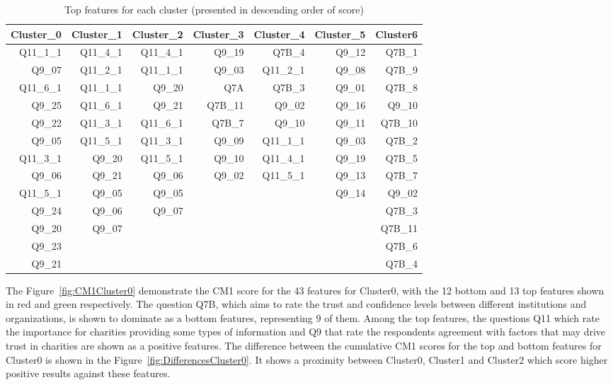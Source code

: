 \documentclass{article}
\begin{document}
\begin{table}[htbp]
  \centering
  \caption{Top features for each cluster (presented in descending order of
  score)}
    \begin{tabular}{rrrrrrr}
    \toprule
    Cluster\_0 & Cluster\_1 & Cluster\_2 & Cluster\_3 & Cluster\_4 & Cluster\_5 & Cluster6 \\
    \midrule
    Q11\_1\_1 & Q11\_4\_1 & Q11\_4\_1 & Q9\_19 & Q7B\_4 & Q9\_12 & Q7B\_1 \\
    Q9\_07 & Q11\_2\_1 & Q11\_1\_1 & Q9\_03 & Q11\_2\_1 & Q9\_08 & Q7B\_9 \\
    Q11\_6\_1 & Q11\_1\_1 & Q9\_20 & Q7A   & Q7B\_3 & Q9\_01 & Q7B\_8 \\
    Q9\_25 & Q11\_6\_1 & Q9\_21 & Q7B\_11 & Q9\_02 & Q9\_16 & Q9\_10 \\
    Q9\_22 & Q11\_3\_1 & Q11\_6\_1 & Q7B\_7 & Q9\_10 & Q9\_11 & Q7B\_10 \\
    Q9\_05 & Q11\_5\_1 & Q11\_3\_1 & Q9\_09 & Q11\_1\_1 & Q9\_03 & Q7B\_2 \\
    Q11\_3\_1 & Q9\_20 & Q11\_5\_1 & Q9\_10 & Q11\_4\_1 & Q9\_19 & Q7B\_5 \\
    Q9\_06 & Q9\_21 & Q9\_06 & Q9\_02 & Q11\_5\_1 & Q9\_13 & Q7B\_7 \\
    Q11\_5\_1 & Q9\_05 & Q9\_05 &       &       & Q9\_14 & Q9\_02 \\
    Q9\_24 & Q9\_06 & Q9\_07 &       &       &       & Q7B\_3 \\
    Q9\_20 & Q9\_07 &       &       &       &       & Q7B\_11 \\
    Q9\_23 &       &       &       &       &       & Q7B\_6 \\
    Q9\_21 &       &       &       &       &       & Q7B\_4 \\
    \bottomrule
    \end{tabular}
  \label{tab:top}
\end{table}




The Figure~\ref{fig:CM1Cluster0} demonstrate the CM1 score for the 43 features
for Cluster0, with the 12 bottom and 13 top features shown in red and green
respectively. The question Q7B, which aims to rate the trust and confidence
levels between different institutions and organizations, is shown to dominate as
a bottom features, representing 9 of them. Among the top features, the
questions Q11 which rate the importance for charities providing some types of
information and Q9 that rate the respondents agreement with factors that may
drive trust in charities are shown as a positive features. The difference
between the cumulative CM1 scores for the top and bottom features for Cluster0
is shown in the Figure~\ref{fig:DifferencesCluster0}. It shows a proximity
between Cluster0, Cluster1 and Cluster2 which score higher positive results
against these features.
\end{document}
